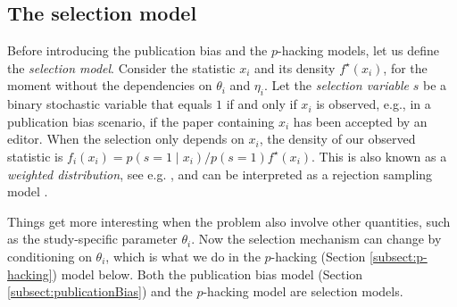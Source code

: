\documentclass[useAMS,usenatbib,referee]{biom}
\newtheorem{prop}[theorem]{Proposition}
\begin{document}
\subsection{The selection model}\label{subsec:selectionModel}
Before introducing the publication bias and the $p$-hacking models, let us define the \emph{selection model}. Consider the statistic $x_i$ and its density $f^{\star}(x_{i})$, for the moment without the dependencies on $\theta_{i}$ and $\eta_{i}$. Let the \emph{selection variable} $s$ be a binary stochastic variable that equals $1$ if and only if $x_i$ is observed, e.g., in a publication bias scenario, if the paper containing $x_i$ has been accepted by an editor. When the selection only depends on $x_i$, the density of our observed statistic is $f_{i}(x_{i}) = p(s=1\mid x_i)/p(s=1)f^{\star}(x_{i})$. This is also known as a \emph{weighted distribution}, see e.g. \citet[][eq. 3.1]{rao1985weighted}, and can be interpreted as a rejection sampling model \citep{von1951various}.

Things get more interesting when the problem also involve other quantities, such as the study-specific parameter $\theta_i$. Now the selection mechanism can change by conditioning on $\theta_i$, which is what we do in the $p$-hacking (Section \ref{subsect:p-hacking}) model below. Both the publication bias model (Section \ref{subsect:publicationBias}) and the $p$-hacking model are selection models.



\end{document}
